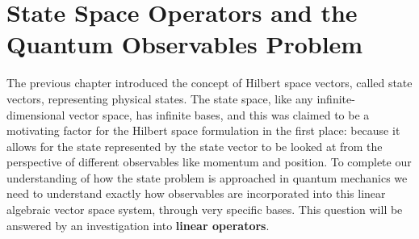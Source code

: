 \chapter{State Space Operators and the Quantum Observables Problem}
The previous chapter introduced the concept of Hilbert space vectors, called state vectors, representing physical states. The state space, like any infinite-dimensional vector space, has infinite bases, and this was claimed to be a motivating factor for the Hilbert space formulation in the first place: because it allows for the state represented by the state vector to be looked at from the perspective of different observables like momentum and position. To complete our understanding of how the state problem is approached in quantum mechanics we need to understand exactly how observables are incorporated into this linear algebraic vector space system, through very specific bases. This question will be answered by an investigation into \textbf{linear operators}. 
